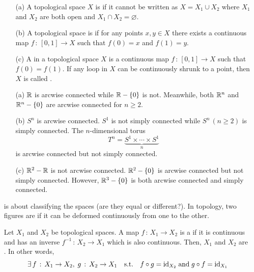 \documentclass[a4paper, 10pt]{article}
\begin{document}
\begin{definition}[Connectedness]
    \hphantom{.}
    \begin{itemize}
        \item[(a)] A topological space $X$ is  if it cannot be written as $X = X_{1} \cup X_{2}$ where $X_{1}$ and $X_{2}$ are both open and $X_{1} \cap X_{2} = \varnothing$.
        \item[(b)] A topological space is  if for any points $x, y \in X$ there exists a continuous map $f \,:\, [0,1] \rightarrow X$ such that $f(0) = x$ and $f(1) = y$.
        \item[(c)] A  in a topological space $X$ is a continuous map $f \,:\, [0,1] \rightarrow X$ such that $f(0) = f(1)$. If any loop in $X$ can be continuously shrunk to a point, then $X$ is called .
    \end{itemize}
\end{definition}

\begin{example}
    \hphantom{.}
    \begin{itemize}
        \item[(a)] $\mathbb{R}$ is arcwise connected while $\mathbb{R}-\{0\}$ is not. Meanwhile, both $\mathbb{R}^{n}$ and $\mathbb{R}^{n} - \{0\}$ are arcwise connected for $n \geq 2$.
        \item[(b)] $S^{n}$ is arcwise connected. $S^{1}$ is not simply connected while  $S^{n}\,(n\geq 2)$ is simply connected. The $n$-dimensional torus
        \[ T^{n} = \underbrace{S^{1} \times \cdots \times S^{1}}_{n} \]
        is arcwise connected but not simply connected.
        \item[(c)] $\mathbb{R}^{2} - \mathbb{R}$ is not arcwise connected. $\mathbb{R}^{2} - \{0\}$ is arcwise connected but not simply connected. However, $\mathbb{R}^{3}-\{0\}$ is both arcwise connected and simply connected.
    \end{itemize}
\end{example}

\seprule

 is about classifying the spaces (are they equal or different?). In topology, two figures are  if it can be deformed continuously from one to the other.
\begin{definition}[Homeomorphisms]
    Let $X_{1}$ and $X_{2}$ be topological spaces. A map $f \,:\, X_{1} \rightarrow X_{2}$ is a  if it is continuous and has an inverse $f^{-1} \,:\, X_{2} \rightarrow X_{1}$ which is also continuous. Then, $X_{1}$ and $X_{2}$ are . In other words,
    \[ \exists\, f\,:\, X_{1} \rightarrow X_{2},\; g\,:\, X_{2} \rightarrow X_{1} \quad\text{s.t.}\quad f\circ g = \mathrm{id}_{X_{2}}\;\text{and}\;g\circ f = \mathrm{id}_{X_{1}} \]
\end{definition}
\end{document}
